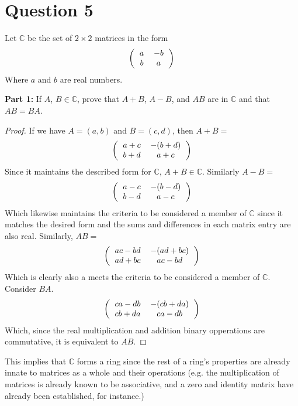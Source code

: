 \documentclass[12pt, letterpaper]{article}
\begin{document}
\section*{Question 5}
Let $\mathbb{C}$ be the set of $2 \times 2$ matrices in the form
\[
\left(
  \begin{tabular}{cc}
  $a$ & $-b$ \\
  $b$ & $a$
  \end{tabular}
\right)
\]
Where $a$ and $b$ are real numbers.

\noindent\textbf{Part 1:} If $A$, $B \in \mathbb{C}$, prove that $A + B$, $A - B$, and $AB$ are in $\mathbb{C}$ and that $AB = BA$.
\begin{proof}
\noindent If we have $A = (a, b)$ and $B = (c, d)$, then $A + B = $
\[
\left(
  \begin{tabular}{cc}
  $a + c$ & $-(b + d)$ \\
  $b + d$ & $a + c$
  \end{tabular}
\right)
\]
Since it maintains the described form for $\mathbb{C}$, $A + B \in \mathbb{C}$. Similarly $A - B =$
\[
\left(
  \begin{tabular}{cc}
  $a - c$ & $-(b - d)$ \\
  $b - d$ & $a - c$
  \end{tabular}
\right)
\]
Which likewise maintains the criteria to be considered a member of $\mathbb{C}$
since it matches the desired form and the sums and differences in each matrix entry are also real.
Similarly, $AB = $
\[
\left(
  \begin{tabular}{cc}
  $ac - bd$ & $-(ad + bc)$ \\
  $ad + bc$ & $ac - bd$
  \end{tabular}
\right)
\]
Which is clearly also a meets the criteria to be considered a member of $\mathbb{C}$. Consider $BA$.
\[
\left(
  \begin{tabular}{cc}
  $ca - db$ & $-(cb + da)$ \\
  $cb + da$ & $ca - db$
  \end{tabular}
\right)
\]
Which, since the real multiplication and addition binary opperations are commutative, it is equivalent to $AB$.
\end{proof}
This implies that $\mathbb{C}$ forms a ring since the rest of a ring's properties are already innate to matrices as a whole and their operations
 (e.g. the multiplication of matrices is already known to be associative, and a zero and identity matrix have already been established, for instance.)
\end{document}
